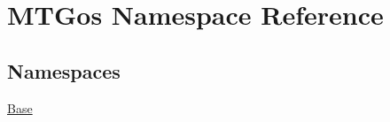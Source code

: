 \hypertarget{namespace_m_t_gos}{}\section{M\+T\+Gos Namespace Reference}
\label{namespace_m_t_gos}
\subsection*{Namespaces}
\begin{DoxyCompactItemize}
\item 
 \hyperlink{namespace_m_t_gos_1_1_base}{Base}
\end{DoxyCompactItemize}
